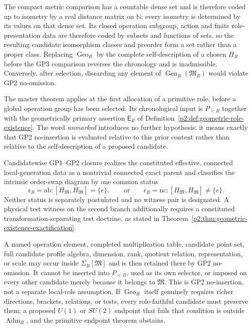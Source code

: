 \documentclass[12pt,a4paper]{article}
\begin{document}
\begin{definition}
The compact metric comparison has a countable dense set and is therefore
coded up to isometry by a real distance matrix on \(\mathbb N\); every
isometry is determined by its values on that dense set.  Its closed
operation subgroup, action and finite role-presentation data are therefore
coded by subsets and functions of sets, so the resulting candidate
isomorphism classes and preorder form a set rather than a proper class.
Replacing \(\operatorname{Geo}_R\) by the complete self-description of a
chosen \(H_R\) before the GP3 comparison reverses the chronology and is
inadmissible.  Conversely, after selection, discarding any element of
\(\operatorname{Gen}_R(\mathfrak M_R)\) would violate GP2 no-omission.
\end{definition}

\begin{definition}
\label{p2:def:unmarked-primitive-role-domain}
The master theorem applies at the first allocation of a primitive role, before
a global operation group has been selected.  Its chronological input is
\(P_{<R}\) together with the geometrically primary assertion \(\mathsf E_R\)
of Definition~\ref{p2:def:geometric-role-existence}.  The word
\emph{unmarked} introduces no further hypothesis: it means exactly that GP2
no-insertion is evaluated relative to this prior content rather than relative
to the self-description of a proposed candidate.

Candidatewise GP1--GP2 closure realizes the constituted effective, connected
local-generation data as a nontrivial connected exact parent and classifies the
intrinsic order-swap diagram by one common status
\[
 \epsilon_R=\mathrm{ab}:
 [H_{\mathfrak M},H_{\mathfrak M}]=\{e\},
 \qquad\text{or}\qquad
 \epsilon_R=\mathrm{nc}:
 [H_{\mathfrak M},H_{\mathfrak M}]\ne\{e\}.
\]
Neither status is separately postulated and no witness pair is designated.  A
physical test witness on the second branch additionally requires a constituted
transformation-separating test doctrine, as stated in
Theorem~\ref{p2:thm:geometric-existence-exactification}.

A named operation element, completed multiplication table, candidate point
set, full candidate profile algebra, dimension, rank, quotient relation,
representation, or scale may occur inside
\(\Sigma_R[\mathfrak M]\) and is then retained there by GP2 no-omission.  It
cannot be inserted into \(P_{<R}\), used as its own selector, or imposed on
every other candidate merely because it belongs to \(\mathfrak M\).  This is
GP2 no-insertion, not a separate local-role assumption.  If
\(\operatorname{Geo}_R\) itself genuinely requires richer directions,
brackets, relations, or tests, every role-faithful candidate must preserve
them; a proposed \(U(1)\) or \(SU(2)\) endpoint that fails that condition is
outside \(\operatorname{Adm}_R\), and the primitive endpoint theorem abstains.
\end{definition}
\end{document}
